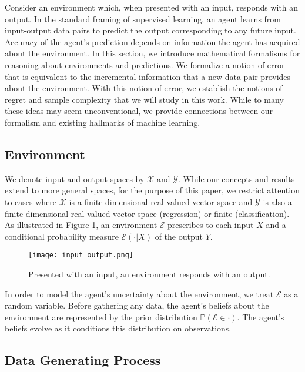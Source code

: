 \documentclass[twoside,11pt]{article}
\def\environment{\mathcal{E}}
\def\Pr{\mathbb{P}}
\newcommand{\Xc}{\mathcal{X}}
\newcommand{\Yc}{\mathcal{Y}}
\begin{document}
Consider an environment which, when presented with an input, responds with an output.  In the standard framing of supervised learning, an agent learns from input-output data pairs to predict the output corresponding to any future input.  Accuracy of the agent's prediction depends on information the agent has acquired about the environment.  In this section, we introduce mathematical formalisms for reasoning about environments and predictions.  We formalize a notion of error that is equivalent to the incremental information that a new data pair provides about the environment. With this notion of error, we establish the notions of regret and sample complexity that we will study in this work. While to many these ideas may seem unconventional, we provide connections between our formalism and existing hallmarks of machine learning.

\subsection{Environment}

We denote input and output spaces by $\Xc$ and $\Yc$.  While our concepts and results extend to more general spaces, for the purpose of this paper, we restrict attention to cases where $\Xc$ is a finite-dimensional real-valued vector space and $\Yc$ is also a finite-dimensional real-valued vector space (regression) or finite (classification).  As illustrated in Figure \ref{fig:environment}, an environment $\environment$ prescribes to each input $X$ and a conditional probability measure $\environment(\cdot | X)$ of the output $Y$.

\begin{figure}[!ht]
\centering
\texttt{[image: input\_output.png]}
\caption{Presented with an input, an environment responds with an output.}
\label{fig:environment}
\end{figure}

In order to model the agent's uncertainty about the environment, we treat $\environment$ as a random variable.  Before gathering any data, the agent's beliefs about the environment are represented by the prior distribution $\Pr(\environment \in \cdot)$.  The agent's beliefs evolve as it conditions this distribution on observations.


\subsection{Data Generating Process}
\label{se:data-generating-process}
\end{document}
